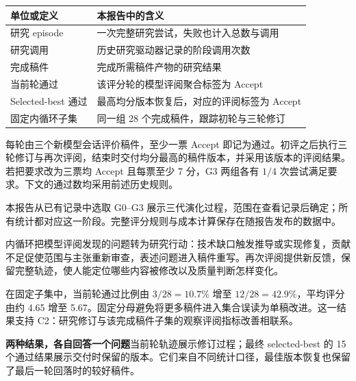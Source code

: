 \begin{center}\small
\begin{tabularx}{\textwidth}{P{34mm}Y}
\toprule
\textbf{单位或定义} & \textbf{本报告中的含义}\\
\midrule
研究 episode & 一次完整研究尝试，失败也计入总数与调用\\
研究调用 & 历史研究驱动器记录的阶段调用次数\\
完成稿件 & 完成所需稿件产物的研究结果\\
当前轮通过 & 该评分轮的模型评阅聚合标签为 Accept\\
Selected-best 通过 & 最高均分版本恢复后，对应的评阅标签为 Accept\\
固定内循环子集 & 同一组 28 个完成稿件，跟踪初轮与三轮修订\\
\bottomrule
\end{tabularx}
\end{center}

每轮由三个新模型会话评价稿件，至少一票 Accept 即记为通过。初评之后执行三轮修订与再次评阅，结束时交付均分最高的稿件版本，并采用该版本的评阅结果。若把要求改为三票均 Accept 且每票至少 7 分，G3 两组各有 $1/4$ 次尝试满足要求。下文的通过数均采用前述历史规则。

本报告从已有记录中选取 G0--G3 展示三代演化过程，范围在查看记录后确定；所有统计都对应这一阶段。完整评分规则与成本计算保存在随报告发布的数据中。


内循环把模型评阅发现的问题转为研究行动：技术缺口触发推导或实现修复，贡献不足促使范围与主张重新审查，表述问题进入稿件重写。再次评阅提供新反馈，保留完整轨迹，使人能定位哪些内容被修改以及质量判断怎样变化。

在固定子集中，当前轮通过比例由 $3/28=10.7\%$ 增至 $12/28=42.9\%$，平均评分由约 4.65 增至 5.67。固定分母避免将更多稿件进入集合误读为单稿改进。这一结果支持 C2：研究修订与该完成稿件子集的观察评阅指标改善相联系。

\begin{insight}
\textbf{两种结果，各自回答一个问题}\quad 当前轮轨迹展示修订过程；最终 selected-best 的 15 个通过结果展示交付时保留的版本。它们来自不同统计口径，最佳版本恢复也保留了最后一轮回落时的较好稿件。
\end{insight}

